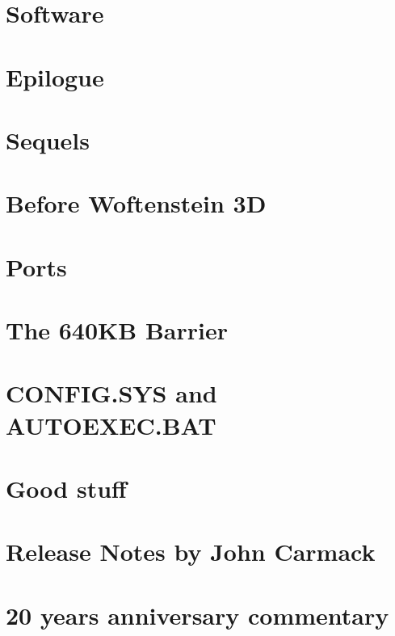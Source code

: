 \documentclass[8pt]{book}
\begin{document}
    \chapter{Software}
       
       
      
       
       
      
       
    
     \chapter{Epilogue}
        
           
    \appendix
    \appendixpage

\chapter{Sequels}
        
        \chapter{Before Woftenstein 3D}
        

    \chapter{Ports}        
        
        
    

    \chapter{The 640KB Barrier}\label{chap:barrier640}
        
    \chapter{CONFIG.SYS and AUTOEXEC.BAT}
         
    \chapter{Good stuff}
          
    \chapter{Release Notes by John Carmack}
        
    \chapter{20 years anniversary commentary}
        

    
    \cleartoleftpage %
    
    \blankpage
    \blankpage
\end{document}

